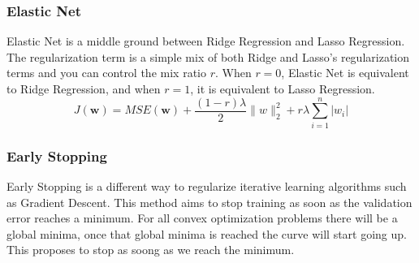 \documentclass[12pt]{article}
\begin{document}
        \subsubsection{Elastic Net}
            Elastic Net is a middle ground between Ridge Regression and Lasso Regression. The regularization term is a simple mix of both Ridge and Lasso's regularization terms and you can control the mix
            ratio $r$. When $r = 0$, Elastic Net is equivalent to Ridge Regression, and when $r = 1$, it is equivalent to Lasso Regression.
            $$ J(\boldsymbol{w}) = MSE(\boldsymbol{w}) + \frac{(1-r)\lambda}{2}\|w\|^2_2 +  r\lambda\sum_{i=1}^n|w_i| $$
        
        \subsubsection{Early Stopping}
            Early Stopping is a different way to regularize iterative learning algorithms such as Gradient Descent. This method aims to stop training as soon as the validation error reaches a minimum. For all
        convex optimization problems there will be a global minima, once that global minima is reached the curve will start going up. This proposes to stop as soong as we reach the minimum.

\printindex
\end{document}
